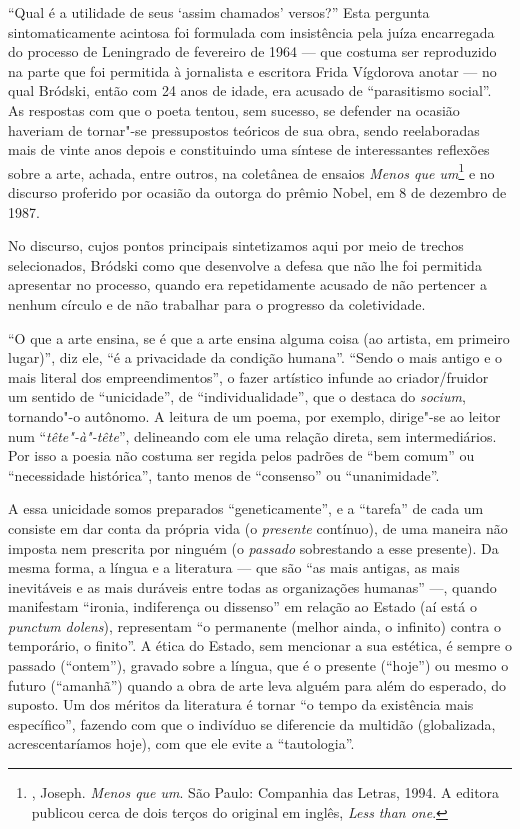 ``Qual é a utilidade de seus `assim chamados' versos?'' Esta pergunta sintomaticamente acintosa foi formulada com insistência pela
juíza encarregada do processo de Leningrado de fevereiro de 1964 ---
que costuma ser reproduzido na parte que foi permitida à jornalista e escritora Frida Vígdorova
anotar --- no qual Bródski, então com 24 anos de idade,
era acusado de ``parasitismo social''. As respostas com que o poeta
tentou, sem sucesso, se defender na ocasião haveriam de tornar"-se
pressupostos teóricos de sua obra, sendo reelaboradas mais de vinte anos
depois e constituindo uma síntese de interessantes reflexões
sobre a arte, achada, entre outros, na coletânea de ensaios \emph{Menos que um}\footnote{, Joseph. \emph{Menos que um}. São Paulo: Companhia das Letras, 1994. A editora publicou cerca de dois terços do original em inglês, \emph{Less than one}.} e no discurso proferido por ocasião da outorga do prêmio Nobel, em 8 de dezembro de 1987.

No discurso, cujos pontos principais sintetizamos aqui por meio de trechos selecionados, Bródski como que
desenvolve a defesa que não lhe foi permitida apresentar no processo,
quando era repetidamente acusado de não pertencer a nenhum círculo e de
não trabalhar para o progresso da coletividade.

``O que a arte ensina, se é que a arte ensina alguma coisa (ao
artista, em primeiro lugar)'', diz ele, ``é a privacidade da
condição humana''. ``Sendo o mais antigo e o mais literal dos
empreendimentos'', o fazer artístico infunde ao criador/fruidor um sentido de
``unicidade'', de ``individualidade'', que o destaca do \emph{socium}, tornando"-o
autônomo. A leitura de um poema, por exemplo, dirige"-se ao leitor num
``\emph{tête"-à"-tête}'', delineando com ele uma relação direta, sem
intermediários. Por isso a poesia não costuma ser regida pelos padrões
de ``bem comum'' ou ``necessidade histórica'', tanto menos de
``consenso'' ou ``unanimidade''.

A essa unicidade somos preparados ``geneticamente'', e a ``tarefa'' de cada um
consiste em dar conta da própria vida (o \emph{presente} contínuo), de
uma maneira não imposta nem prescrita por ninguém (o \emph{passado}
sobrestando a esse presente). Da mesma forma, a língua e
a literatura --- que são ``as mais antigas, as mais
inevitáveis e as mais duráveis entre todas as organizações humanas'' ---,
quando manifestam ``ironia, indiferença ou dissenso'' em relação ao Estado
(aí está o \emph{punctum dolens}), representam ``o permanente (melhor ainda, o infinito) contra o temporário, o finito''. A ética do
Estado, sem mencionar a sua estética, é sempre o passado (``ontem''), gravado
sobre a língua, que é o presente (``hoje'') ou mesmo o futuro (``amanhã'') quando a obra de arte
leva alguém para além do esperado, do
suposto. Um dos méritos da literatura é tornar ``o tempo da existência
mais específico'', fazendo com que o indivíduo se diferencie da multidão
(globalizada, acrescentaríamos hoje), com que ele evite a ``tautologia''.


